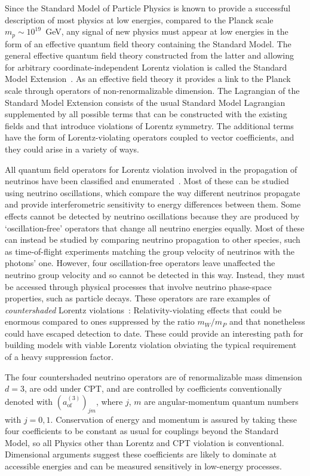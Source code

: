 Since the Standard Model of Particle Physics is known to provide a successful
description of most physics at low energies, compared to the Planck scale
$m_p\sim10^{19}$~GeV, any signal of new physics must appear at low energies in
the form of an effective quantum field theory containing the Standard Model.
The general effective quantum field theory constructed from the latter and
allowing for arbitrary coordinate-independent Lorentz violation is called the
Standard Model Extension~\cite{Colladay1997, Colladay1998}. As an effective field theory
it provides a link to the Planck scale through operators of non-renormalizable
dimension. The Lagrangian of the Standard Model Extension consists of the usual
Standard Model Lagrangian supplemented by all possible terms that can be
constructed with the existing fields and that introduce violations of Lorentz
symmetry. The additional terms have the form of Lorentz-violating operators
coupled to vector coefficients, and they could arise in a variety of ways.

All quantum field operators for Lorentz violation involved in the propagation
of neutrinos have been classified and enumerated~\cite{Kostelecky2012}. Most of
these can be studied using neutrino oscillations, which compare the way
different neutrinos propagate and provide interferometric sensitivity to energy
differences between them. Some effects cannot be detected by neutrino
oscillations because they are produced by ‘oscillation-free’ operators that
change all neutrino energies equally. Most of these can instead be studied by
comparing neutrino propagation to other species, such as time-of-flight
experiments matching the group velocity of neutrinos with the photons' one.
However, four oscillation-free operators leave unaffected the neutrino group
velocity and so cannot be detected in this way. Instead, they must be accessed
through physical processes that involve neutrino phase-space properties, such
as particle decays. These operators are rare examples of \textit{countershaded}
Lorentz violations~\cite{Kostelecky2009}: Relativity-violating effects that could
be enormous compared to ones suppressed by the ratio $m_W/m_P$ and that
nonetheless could have escaped detection to date. These could provide an
interesting path for building models with viable Lorentz violation obviating
the typical requirement of a heavy suppression factor.

The four countershaded neutrino operators are of renormalizable mass dimension
$d = 3$, are odd under CPT, and are controlled by coefficients conventionally
denoted with $(a^{(3)}_\text{of})_{jm}$, where $j$, $m$ are angular-momentum
quantum numbers with $j = 0,1$. Conservation of energy and momentum is assured
by taking these four coefficients to be constant as usual for couplings beyond
the Standard Model, so all Physics other than Lorentz and CPT violation is
conventional. Dimensional arguments suggest these coefficients are likely to
dominate at accessible energies and can be measured sensitively in low-energy
processes.

